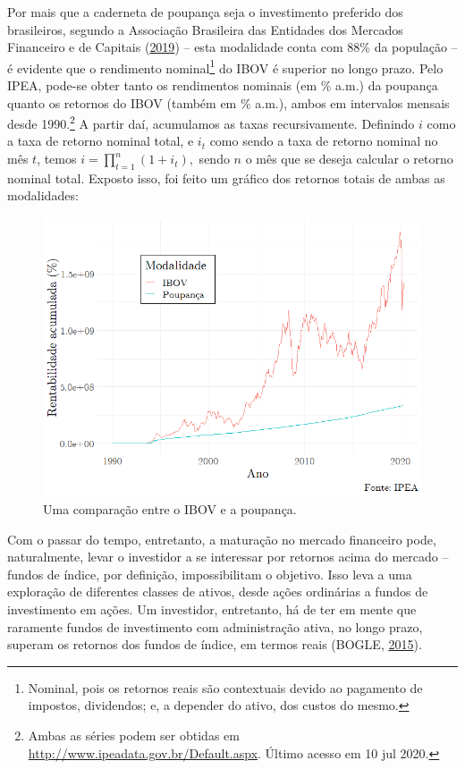 \documentclass[aprovado,numbers]{coppe}
\begin{document}
  Por mais que a caderneta de poupança seja o investimento preferido dos brasileiros, segundo a Associação Brasileira das Entidades dos Mercados Financeiro e de Capitais (\protect\hyperlink{ref-anbima2019}{2019}) -- esta modalidade conta com 88\% da população -- é evidente que o rendimento nominal\footnote{Nominal, pois os retornos reais são contextuais devido ao pagamento de impostos, dividendos; e, a depender do ativo, dos custos do mesmo.} do IBOV é superior no longo prazo. Pelo IPEA, pode-se obter tanto os rendimentos nominais (em \% a.m.) da poupança quanto os retornos do IBOV (também em \% a.m.), ambos em intervalos mensais desde 1990.\footnote{Ambas as séries podem ser obtidas em \url{http://www.ipeadata.gov.br/Default.aspx}. Último acesso em 10 jul 2020.} A partir daí, acumulamos as taxas recursivamente. Definindo \(i\) como a taxa de retorno nominal total, e \(i_t\) como sendo a taxa de retorno nominal no mês \(t\), temos \(i = \prod_{t=1}^n (1+i_t),\) sendo \(n\) o mês que se deseja calcular o retorno nominal total. Exposto isso, foi feito um gráfico dos retornos totais de ambas as modalidades:
  \begin{figure}[H]
  \includegraphics[width=1\linewidth]{img/ibov-poupanca} \caption{Uma comparação entre o IBOV e a poupança.}\label{fig:unnamed-chunk-1}
  \end{figure}
  Com o passar do tempo, entretanto, a maturação no mercado financeiro pode, naturalmente, levar o investidor a se interessar por retornos acima do mercado -- fundos de índice, por definição, impossibilitam o objetivo. Isso leva a uma exploração de diferentes classes de ativos, desde ações ordinárias a fundos de investimento em ações. Um investidor, entretanto, há de ter em mente que raramente fundos de investimento com administração ativa, no longo prazo, superam os retornos dos fundos de índice, em termos reais (BOGLE, \protect\hyperlink{ref-bogle2015}{2015}).
\end{document}
